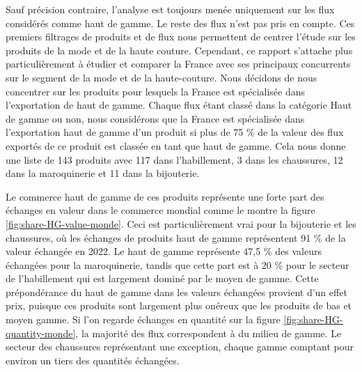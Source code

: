 \documentclass[french,10pt,a4paper]{article}
\begin{document}
\bigskip

Sauf précision contraire, l'analyse est toujours menée uniquement sur les flux considérés comme haut de gamme. Le reste des flux n'est pas pris en compte. Ces premiers filtrages de produits et de flux nous permettent de centrer l'étude sur les produits de la mode et de la haute couture. Cependant, ce rapport s'attache plus particulièrement à étudier et comparer la France avec ses principaux concurrents sur le segment de la mode et de la haute-couture. Nous décidons de nous concentrer sur les produits pour lesquels la France est spécialisée dans l'exportation de haut de gamme. Chaque flux étant classé dans la catégorie Haut de gamme ou non, nous considérons que la France est spécialisée dans l'exportation haut de gamme d'un produit si plus de 75 \% de la valeur des flux exportés de ce produit est classée en tant que haut de gamme. Cela nous donne une liste de 143 produits avec 117 dans l'habillement, 3 dans les chaussures, 12 dans la maroquinerie et 11 dans la bijouterie.

Le commerce haut de gamme de ces produits représente une forte part des échanges en valeur dans le commerce mondial comme le montre la figure \ref{fig:share-HG-value-monde}. Ceci est particulièrement vrai pour la bijouterie et les chaussures, où les échanges de produits haut de gamme représentent 91 \% de la valeur échangée en 2022. Le haut de gamme représente 47,5 \% des valeurs échangées pour la maroquinerie, tandis que cette part est à 20 \% pour le secteur de l'habillement qui est largement dominé par le moyen de gamme. Cette prépondérance du haut de gamme dans les valeurs échangées provient d'un effet prix, puisque ces produits sont largement plus onéreux que les produits de bas et moyen gamme. Si l'on regarde échanges en quantité sur la figure \ref{fig:share-HG-quantity-monde}, la majorité des flux correspondent à du milieu de gamme. Le secteur des chaussures représentant une exception, chaque gamme comptant pour environ un tiers des quantités échangées.
\end{document}
